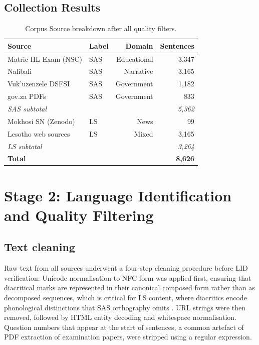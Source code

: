 \documentclass[12pt]{ThesisRU}
\begin{document}
\subsection{Collection Results}

\begin{table}[ht]
    \centering
    \label{tab:corpus_sources}
    \caption{Corpus Source breakdown after all quality filters.}
    \begin{tabular}{llrr}
     \toprule
    \textbf{Source} & \textbf{Label} & \textbf{Domain} & \textbf{Sentences} \\
    \midrule
    Matric HL Exam (NSC)   & SAS & Educational  & 3,347 \\
    Nalibali               & SAS & Narrative    & 3,165 \\
    Vuk'uzenzele DSFSI     & SAS & Government   & 1,182 \\
    gov.za PDFs            & SAS & Government   &   833 \\
    \midrule
    \textit{SAS subtotal}  &     &              & \textit{5,362} \\
    \midrule
    Mokhosi SN (Zenodo)    & LS  & News         &    99 \\
    Lesotho web sources    & LS  & Mixed        & 3,165 \\
    \midrule
    \textit{LS subtotal}   &     &              & \textit{3,264} \\
    \midrule
    \textbf{Total}         &     &              & \textbf{8,626} \\
    \bottomrule
    \end{tabular}
\end{table}



\section{Stage 2: Language Identification and Quality Filtering}

\subsection{Text cleaning}

Raw text from all sources underwent a four-step cleaning procedure before LID verification. Unicode normalisation to NFC form was applied first, ensuring that diacritical marks are represented in their canonical composed form rather than as decomposed sequences, which is critical for LS content, where diacritics encode phonological distinctions that SAS orthography omits \citep{matlosa2017sesotho}. URL strings were then removed, followed by HTML entity decoding and whitespace normalisation. Question numbers that appear at the start of sentences, a common artefact of PDF extraction of examination papers, were stripped using a regular expression.
\end{document}
